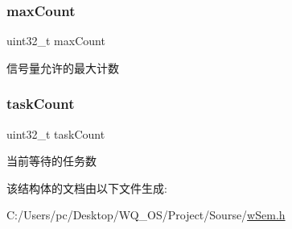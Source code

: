 \subsubsection{\texorpdfstring{max\+Count}{maxCount}}
{\footnotesize\ttfamily uint32\+\_\+t max\+Count}

信号量允许的最大计数 \mbox{\label{struct__w_sem_info_a80462c64b9184115aa568f08227f7f4a}} 
\subsubsection{\texorpdfstring{task\+Count}{taskCount}}
{\footnotesize\ttfamily uint32\+\_\+t task\+Count}

当前等待的任务数 

该结构体的文档由以下文件生成\+:\begin{DoxyCompactItemize}
\item 
C\+:/\+Users/pc/\+Desktop/\+W\+Q\+\_\+\+O\+S/\+Project/\+Sourse/\mbox{\hyperlink{w_sem_8h}{w\+Sem.\+h}}\end{DoxyCompactItemize}
